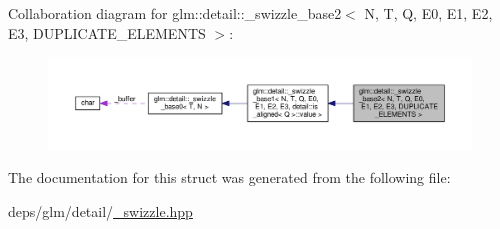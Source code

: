 Collaboration diagram for glm\+:\+:detail\+:\+:\+\_\+swizzle\+\_\+base2$<$ N, T, Q, E0, E1, E2, E3, D\+U\+P\+L\+I\+C\+A\+T\+E\+\_\+\+E\+L\+E\+M\+E\+N\+TS $>$\+:
\nopagebreak
\begin{figure}[H]
\begin{center}
\leavevmode
\includegraphics[width=350pt]{d3/d07/structglm_1_1detail_1_1__swizzle__base2__coll__graph}
\end{center}
\end{figure}


The documentation for this struct was generated from the following file\+:\begin{DoxyCompactItemize}
\item 
deps/glm/detail/\hyperlink{__swizzle_8hpp}{\+\_\+swizzle.\+hpp}\end{DoxyCompactItemize}
